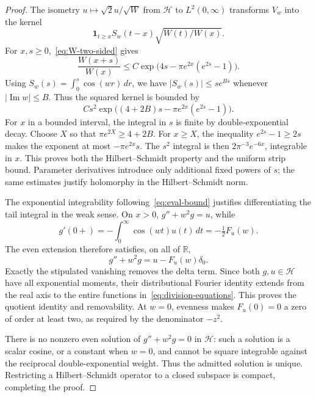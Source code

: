 \documentclass[11pt,a4paper]{article}
\numberwithin{equation}{section}
\theoremstyle{definition}
\theoremstyle{remark}
\newcommand{\R}{\mathbb R}
\newcommand{\Hh}{\mathcal H}
\begin{document}
\begin{proof}
The isometry $u\mapsto\sqrt2u/\sqrt W$ from $\Hh$ to $L^2(0,\infty)$ transforms $V_w$ into the kernel
\[
 \boldsymbol1_{t\ge x}S_w(t-x)\sqrt{W(t)/W(x)}.
\]
For $x,s\ge0$,~\eqref{eq:W-two-sided} gives
\begin{equation}\label{eq:weight-ratio}
 \frac{W(x+s)}{W(x)}\le C\exp\bigl(4s-\pi e^{2x}(e^{2s}-1)\bigr).
\end{equation}
Using $S_w(s)=\int_0^s\cos(wr)\,dr$, we have $|S_w(s)|\le s e^{Bs}$ whenever $|\operatorname{Im}w|\le B$. Thus the squared kernel is bounded by
\begin{equation}\label{eq:HS-majorant}
 Cs^2\exp\bigl((4+2B)s-\pi e^{2x}(e^{2s}-1)\bigr).
\end{equation}
For $x$ in a bounded interval, the integral in $s$ is finite by double-exponential decay. Choose $X$ so that $\pi e^{2X}\ge4+2B$. For $x\ge X$, the inequality $e^{2s}-1\ge2s$ makes the exponent at most $-\pi e^{2x}s$. The $s^2$ integral is then $2\pi^{-3}e^{-6x}$, integrable in $x$. This proves both the Hilbert--Schmidt property and the uniform strip bound. Parameter derivatives introduce only additional fixed powers of $s$; the same estimates justify holomorphy in the Hilbert--Schmidt norm.

The exponential integrability following~\eqref{eq:eval-bound} justifies differentiating the tail integral in the weak sense. On $x>0$,
$g''+w^2g=u$, while
\begin{equation}\label{eq:jump}
 g'(0+)=-\int_0^\infty\cos(wt)u(t)\,dt=-\tfrac12F_u(w).
\end{equation}
The even extension therefore satisfies, on all of $\R$,
\begin{equation}\label{eq:jump-distribution}
 g''+w^2g=u-F_u(w)\delta_0.
\end{equation}
Exactly the stipulated vanishing removes the delta term. Since both $g,u\in\Hh$ have all exponential moments, their distributional Fourier identity extends from the real axis to the entire functions in~\eqref{eq:division-equations}. This proves the quotient identity and removability. At $w=0$, evenness makes $F_u(0)=0$ a zero of order at least two, as required by the denominator $-z^2$.

There is no nonzero even solution of $g''+w^2g=0$ in $\Hh$: such a solution is a scalar cosine, or a constant when $w=0$, and cannot be square integrable against the reciprocal double-exponential weight. Thus the admitted solution is unique. Restricting a Hilbert--Schmidt operator to a closed subspace is compact, completing the proof.
\end{proof}
\end{document}
